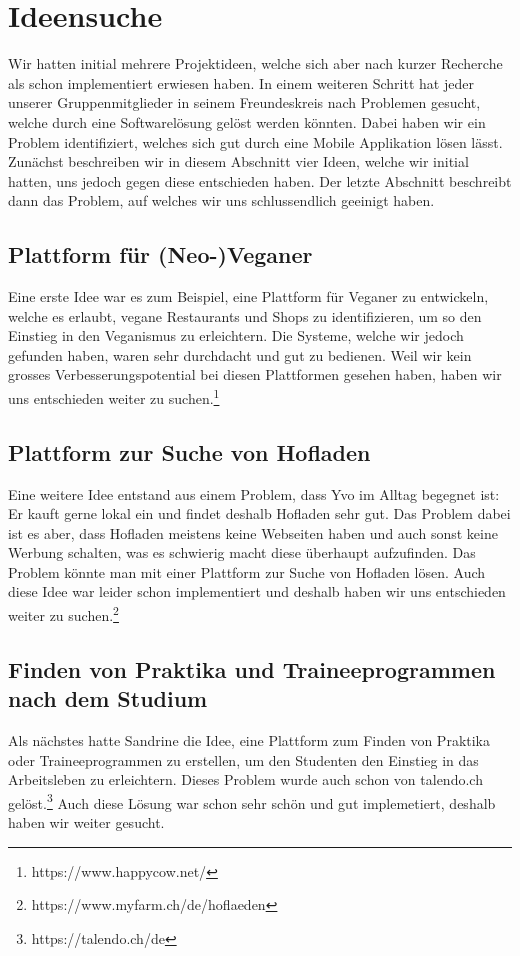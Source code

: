 \section{Ideensuche}
Wir hatten initial mehrere Projektideen, welche sich aber nach kurzer Recherche als schon implementiert erwiesen haben.
In einem weiteren Schritt hat jeder unserer Gruppenmitglieder in seinem Freundeskreis nach Problemen gesucht, welche durch eine Softwarelösung gelöst werden könnten. 
Dabei haben wir ein Problem identifiziert, welches sich gut durch eine Mobile Applikation lösen lässt. Zunächst beschreiben wir in diesem Abschnitt vier Ideen, welche wir initial hatten, uns jedoch gegen diese entschieden haben. Der letzte Abschnitt beschreibt dann das Problem, auf welches wir uns schlussendlich geeinigt haben.

\subsection{Plattform für (Neo-)Veganer}
 Eine erste Idee war es zum Beispiel, eine Plattform für Veganer zu entwickeln, welche es erlaubt, vegane Restaurants und Shops zu identifizieren, um so den Einstieg in den Veganismus zu erleichtern. Die Systeme, welche wir jedoch gefunden haben, waren sehr durchdacht und gut zu bedienen. Weil wir kein grosses Verbesserungspotential bei diesen Plattformen gesehen haben, haben wir uns entschieden weiter zu suchen.\footnote{https://www.happycow.net/}
 
 \subsection{Plattform zur Suche von Hofladen}
 Eine weitere Idee entstand aus einem Problem, dass Yvo im Alltag begegnet ist: Er kauft gerne lokal ein und findet deshalb Hofladen sehr gut. Das Problem dabei ist es aber, dass Hofladen meistens keine Webseiten haben und auch sonst keine Werbung schalten, was es schwierig macht diese überhaupt aufzufinden. Das Problem könnte man mit einer Plattform zur Suche von Hofladen lösen. Auch diese Idee war leider schon implementiert und deshalb haben wir uns entschieden weiter zu suchen.\footnote{https://www.myfarm.ch/de/hoflaeden}
 
 \subsection{Finden von Praktika und Traineeprogrammen nach dem Studium}
 Als nächstes hatte Sandrine die Idee, eine Plattform zum Finden von Praktika oder Traineeprogrammen zu erstellen, um den Studenten den Einstieg in das Arbeitsleben zu erleichtern. Dieses Problem wurde auch schon von talendo.ch gelöst.\footnote{https://talendo.ch/de} Auch diese Lösung war schon sehr schön und gut implemetiert, deshalb haben wir weiter gesucht.
 
